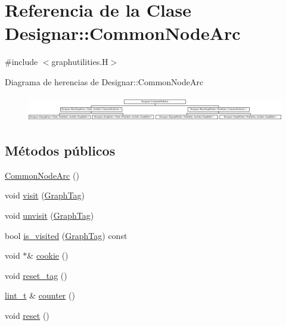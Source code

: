 \hypertarget{class_designar_1_1_common_node_arc}{}\section{Referencia de la Clase Designar\+:\+:Common\+Node\+Arc}
\label{class_designar_1_1_common_node_arc}


{\ttfamily \#include $<$graphutilities.\+H$>$}

Diagrama de herencias de Designar\+:\+:Common\+Node\+Arc\begin{figure}[H]
\begin{center}
\leavevmode
\includegraphics[height=1.122995cm]{class_designar_1_1_common_node_arc}
\end{center}
\end{figure}
\subsection*{Métodos públicos}
\begin{DoxyCompactItemize}
\item 
\hyperlink{class_designar_1_1_common_node_arc_a7b0794f171cc8ad5b5e4c28216366c53}{Common\+Node\+Arc} ()
\item 
void \hyperlink{class_designar_1_1_common_node_arc_a14b77740fb6d68b1949483c71dd4b197}{visit} (\hyperlink{namespace_designar_ac91366256ea6ea6ac5fd483d55a7499e}{Graph\+Tag})
\item 
void \hyperlink{class_designar_1_1_common_node_arc_ae8f3fed57cacf9e8cfa0df582eeecf3b}{unvisit} (\hyperlink{namespace_designar_ac91366256ea6ea6ac5fd483d55a7499e}{Graph\+Tag})
\item 
bool \hyperlink{class_designar_1_1_common_node_arc_a1852b6cf543bfb695bad590804ecaacd}{is\+\_\+visited} (\hyperlink{namespace_designar_ac91366256ea6ea6ac5fd483d55a7499e}{Graph\+Tag}) const
\item 
void $\ast$\& \hyperlink{class_designar_1_1_common_node_arc_a385a91e2bddd8a6f69d418b36b2cf11e}{cookie} ()
\item 
void \hyperlink{class_designar_1_1_common_node_arc_a436f2993d4da6ec9f750adc465e7c691}{reset\+\_\+tag} ()
\item 
\hyperlink{namespace_designar_a9d113d66a39e82b73727c72cd3a52f73}{lint\+\_\+t} \& \hyperlink{class_designar_1_1_common_node_arc_a8bdada8dfdf47ad02c91cca8c848d287}{counter} ()
\item 
void \hyperlink{class_designar_1_1_common_node_arc_a1dd1385837012b02ee3c67a7e3f5ccc1}{reset} ()
\end{DoxyCompactItemize}


